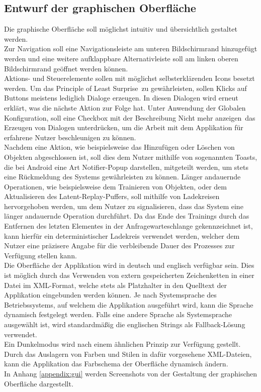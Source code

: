 \documentclass[oneside]{ausarbeitung}
\begin{document}
\subsection{Entwurf der graphischen Oberfläche}
Die graphische Oberfläche soll möglichst intuitiv und übersichtlich gestaltet werden.\\
Zur Navigation soll eine Navigationsleiste am unteren Bildschirmrand hinzugefügt werden und eine weitere aufklappbare Alternativleiste soll am linken oberen Bildschirmrand geöffnet werden können.\\
Aktions- und Steuerelemente sollen mit möglichst selbsterklärenden Icons besetzt werden. Um das \glqq Principle of Least Surprise\grqq\ zu gewährleisten, sollen Klicks auf Buttons meistens lediglich Dialoge erzeugen. In diesen Dialogen wird erneut erklärt, was die nächste Aktion zur Folge hat. Unter Anwendung der Globalen Konfiguration, soll eine Checkbox mit der Beschreibung \glqq Nicht mehr anzeigen\grqq\ das Erzeugen von Dialogen unterdrücken, um die Arbeit mit dem Applikation für erfahrene Nutzer beschleunigen zu können.\\
Nachdem eine Aktion, wie beispielsweise das Hinzufügen oder Löschen von Objekten abgeschlossen ist, soll dies dem Nutzer mithilfe von sogenannten Toasts, die bei Android eine Art Notifier-Popup darstellen, mitgeteilt werden, um stets eine Rückmeldung des Systems gewährleisten zu können. Länger andauernde Operationen, wie beispielsweise dem Trainieren von Objekten, oder dem Aktualisieren des Latent-Replay-Puffers, soll mithilfe von Ladekreisen hervorgehoben werden, um dem Nutzer zu signalisieren, dass das System eine länger andauernde Operation durchführt. Da das Ende des Trainings durch das Entfernen des letzten Elementes in der Anfragewarteschlange gekennzeichnet ist, kann hierfür ein deterministischer Ladekreis verwendet werden, welcher dem Nutzer eine präzisere Angabe für die verbleibende Dauer des Prozesses zur Verfügung stellen kann.\\
Die Oberfläche der Applikation wird in deutsch und englisch verfügbar sein. Dies ist möglich durch das Verwenden von extern gespeicherten Zeichenketten in einer Datei im XML-Format, welche stets als Platzhalter in den Quelltext der Applikation eingebunden werden können. Je nach Systemsprache des Betriebssystems, auf welchem die Applikation ausgeführt wird, kann die Sprache dynamisch festgelegt werden. Falls eine andere Sprache als Systemsprache ausgewählt ist, wird standardmäßig die englischen Strings als Fallback-Lösung verwendet.\\
Ein Dunkelmodus wird nach einem ähnlichen Prinzip zur Verfügung gestellt. Durch das Auslagern von Farben und Stilen in dafür vorgesehene XML-Dateien, kann die Applikation das Farbschema der Oberfläche dynamisch ändern.\\
In Anhang \ref{appendix:gui} werden Screenshots von der Gestaltung der graphischen Oberfläche dargestellt.
\end{document}
